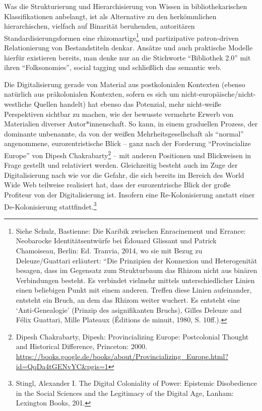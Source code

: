 \documentclass[a4paper,
fontsize=11pt,
oneside,
numbers=noperiodatend,
parskip=half-,
bibliography=totoc,
final
]{scrartcl}
\begin{document}
Was die Strukturierung und Hierarchisierung von Wissen in
bibliothekarischen Klassifikationen anbelangt, ist als Alternative zu
den herkömmlichen hierarchischen, vielfach auf Binarität beruhenden,
autoritären Standardisierungsformen eine rhizomartige\footnote{Siehe
  Schulz, Bastienne: Die Karibik zwischen Enracinement und Errance:
  Neobarocke Identitätsentwürfe bei Édouard Glissant und Patrick
  Chamoiseau, Berlin: Ed. Tranvia, 2014, wo sie mit Bezug zu
  Deleuze/Guattari erläutert: ``Die Prinzipien der Konnexion und
  Heterogenität besagen, dass im Gegensatz zum Strukturbaum das Rhizom
  nicht aus binären Verbindungen besteht. Es verbindet vielmehr mittels
  unterschiedlicher Linien einen beliebigen Punkt mit einem anderen.
  Treffen diese Linien aufeinander, entsteht ein Bruch, an dem das
  Rhizom weiter wuchert. Es entsteht eine \enquote*{Anti-Genealogie}
  (Prinzip des asignifikanten Bruchs), Gilles Deleuze and Félix
  Guattari, Mille Plateaux (Éditions de minuit, 1980, S. 10ff.).} und
partizipative patron-driven Relationierung von Bestandstiteln denkar.
Ansätze und auch praktische Modelle hierfür existieren bereits, man
denke nur an die Stichworte \enquote{Bibliothek 2.0} mit ihren
\enquote{Folksonomies}, social tagging und schließlich das semantic web.

Die Digitalisierung gerade von Material aus postkolonialen Kontexten
(ebenso natürlich aus präkolonialen Kontexten, sofern es sich um
nicht-europäische/nicht-westliche Quellen handelt) hat ebenso das
Potenzial, mehr nicht-weiße Perspektiven sichtbar zu machen, wie der
bewusste vermehrte Erwerb von Materialien diverser Autor*innenschaft. So
kann, in einem graduellen Prozess, der dominante unbenannte, da von der
weißen Mehrheitsgesellschaft als \enquote{normal} angenommene,
eurozentristische Blick -- ganz nach der Forderung
\enquote{Provincialize Europe} von Dipesh Chakrabarty\footnote{Dipesh
  Chakrabarty, Dipesh: Provincializing Europe: Postcolonial Thought and
  Historical Difference, Princeton: 2000.
  \url{https://books.google.de/books/about/Provincializing_Europe.html?id=QqDa4tGENvYC\&pgis=1}}
-- mit anderen Positionen und Blickweisen in Frage gestellt und
relativiert werden. Gleichzeitig besteht auch im Zuge der
Digitalisierung nach wie vor die Gefahr, die sich bereits im Bereich des
World Wide Web teilweise realisiert hat, dass der eurozentrische Blick
der große Profiteur von der Digitalisierung ist. Insofern eine
Re-Kolonisierung anstatt einer De-Kolonisierung stattfindet.\footnote{Stingl,
  Alexander I. The Digital Coloniality of Power: Epistemic Disobedience
  in the Social Sciences and the Legitimacy of the Digital Age, Lanham:
  Lexington Books, 201.}
\end{document}
